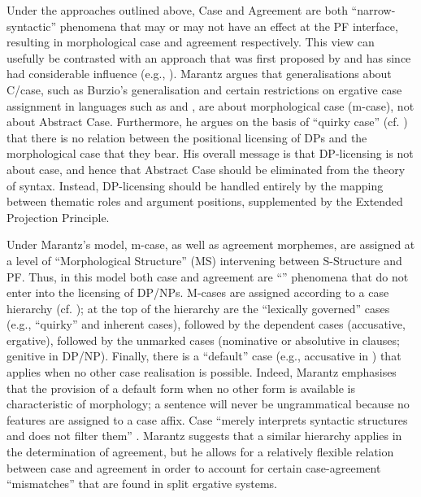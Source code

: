 \documentclass[output=paper]{langsci/langscibook}
\begin{document}
Under the approaches outlined above, Case and Agreement are both ``narrow-syntactic'' phenomena that may or may not have an effect at the PF interface, resulting in morphological case and agreement respectively. This view can usefully be contrasted with an approach that was first proposed by \citet{Marantz1991} and has since had considerable influence (e.g., \citealt{Harley1995,Schütze1997,McFadden2004,Bobaljik2008Phi,Baker2010,Titov2012}). Marantz argues that generalisations about C\slash case, such as Burzio’s generalisation \citep{Burzio1986} and certain restrictions on ergative case assignment in languages such as  and , are about morphological case (m-case), not about Abstract Case. Furthermore, he argues on the basis of  ``quirky case'' (cf. \citealt{Zaenen1985}) that there is no relation between the positional licensing of DPs and the morphological case that they bear. His overall message is that DP-licensing is not about case, and hence that Abstract Case should be eliminated from the theory of syntax. Instead, DP-licensing should be handled entirely by the mapping between thematic roles and argument positions, supplemented by the Extended Projection Principle.

Under Marantz’s model, m-case, as well as agreement morphemes, are assigned at a level of ``Morphological Structure'' (MS) intervening between S-Struc\-ture and PF. Thus, in this model both case and agreement are ``'' phenomena that do not enter into the licensing of DP\slash NPs. M-cases are assigned according to a case hierarchy (cf. \citealt{Yip1987}); at the top of the hierarchy are the ``lexically governed'' cases (e.g., ``quirky'' and inherent cases), followed by the dependent cases (accusative, ergative), followed by the unmarked cases (nominative or absolutive in clauses; genitive in DP\slash NP). Finally, there is a ``default'' case (e.g., accusative in ) that applies when no other case realisation is possible. Indeed, Marantz emphasises that the provision of a default form when no other form is available is characteristic of morphology; a sentence will never be ungrammatical because no features are assigned to a case affix. Case “merely interprets syntactic structures and does not filter them” \citep[24]{Marantz1991}. Marantz suggests that a similar hierarchy applies in the determination of agreement, but he allows for a relatively flexible relation between case and agreement in order to account for certain case-agreement ``mismatches'' that are found in split ergative systems.
\end{document}
